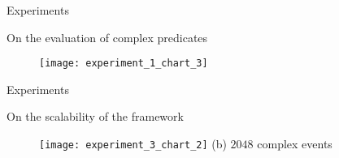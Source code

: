 \documentclass[xcolor=pdftex,dvipsnames,table]{beamer}
\begin{document}

\begin{frame}{Experiments}
  \begin{block}{On the evaluation of complex predicates}
    \begin{figure}[H]
        \centering
        \texttt{[image: experiment\_1\_chart\_3]}
    \end{figure}
  \end{block}
\end{frame}


\begin{frame}{Experiments}
  \begin{block}{On the scalability of the framework}
    \begin{figure}[H]
        \centering
        \texttt{[image: experiment\_3\_chart\_2]}
        \tiny (b) $2048$ complex events
    \end{figure}
  \end{block}
\end{frame}

\end{document}
